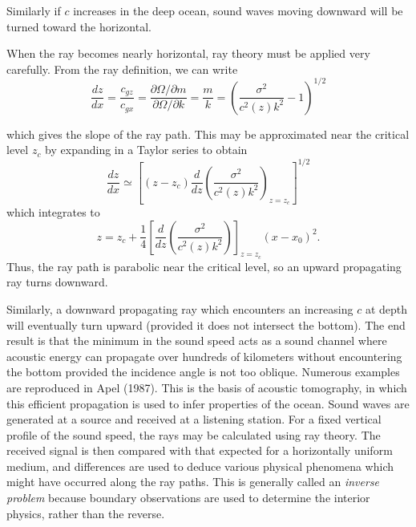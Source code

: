
Similarly if $c$ increases in the deep ocean, sound waves moving downward will be
turned toward the horizontal.

When the ray becomes nearly horizontal, ray theory must be applied very
carefully. From the ray definition, we can write
\[
	\frac{dz}{dx}=\frac{c_{gz}}{c_{gx}}
	=\frac{\partial\Omega/\partial m}{\partial\Omega/\partial k}
	=\frac{m}{k}
	=\left(\frac{\sigma^2}{c^2(z)k^2}-1\right)^{1/2}
\]

\sourcepagebreak

which gives the slope of the ray path. This may be approximated near the critical level
$z_c$ by expanding in a Taylor series to obtain
\[
	\frac{dz}{dx}\simeq
	\left[
		(z-z_c)\frac{d}{dz}\left(\frac{\sigma^2}{c^2(z)k^2}\right)_{z=z_c}
		\right]^{1/2}
\]
which integrates to
\[
	z=z_c+\frac14
	\left[\frac{d}{dz}\left(\frac{\sigma^2}{c^2(z)k^2}\right)\right]_{z=z_c}
	(x-x_0)^2.
\]
Thus, the ray path is parabolic near the critical level, so an upward propagating ray
turns downward.

Similarly, a downward propagating ray which encounters an increasing $c$ at
depth will eventually turn upward (provided it does not intersect the bottom). The
end result is that the minimum in the sound speed acts as a sound channel where
acoustic energy can propagate over hundreds of kilometers without encountering the
bottom provided the incidence angle is not too oblique. Numerous examples are
reproduced in Apel (1987). This is the basis of acoustic tomography, in which this
efficient propagation is used to infer properties of the ocean. Sound waves are
generated at a source and received at a listening station. For a fixed vertical profile of
the sound speed, the rays may be calculated using ray theory. The received signal is
then compared with that expected for a horizontally uniform medium, and differences
are used to deduce various physical phenomena which might have occurred along the
ray paths. This is generally called an \emph{inverse problem} because boundary observations
are used to determine the interior physics, rather than the reverse.

